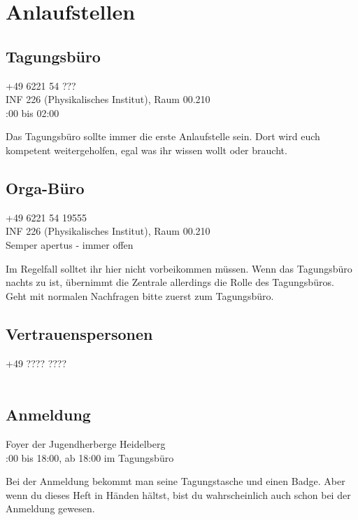 
\section{Anlaufstellen}

\subsection{Tagungsbüro}
\faPhone \quad +49 6221 54 ???\\ %
\faMapPin \quad INF 226 (Physikalisches Institut), Raum 00.210\\ %
\faClockO {}:00 bis 02:00 %

\noindent Das Tagungsbüro sollte immer die erste Anlaufstelle sein. Dort wird euch kompetent weitergeholfen, egal was ihr wissen wollt oder braucht.

\subsection{Orga-Büro}
\faPhone \quad +49 6221 54 19555\\
\faMapPin \quad INF 226 (Physikalisches Institut), Raum 00.210\\
\faClockO \quad Semper apertus - immer offen

\noindent Im Regelfall solltet ihr hier nicht vorbeikommen müssen. Wenn das Tagungsbüro nachts zu ist, übernimmt die Zentrale allerdings die Rolle des Tagungsbüros. Geht mit normalen Nachfragen bitte zuerst zum Tagungsbüro. %

\subsection{Vertrauenspersonen}
\faPhone \quad +49 ???? ????\\ %
\faUsers \quad \\ %

\noindent %

\subsection{Anmeldung}
\faMapPin \quad Foyer der Jugendherberge Heidelberg\\ %
\faClockO {}:00 bis 18:00, ab 18:00 im Tagungsbüro %

\noindent Bei der Anmeldung bekommt man seine Tagungstasche und einen Badge. Aber wenn du dieses Heft in Händen hältst, bist du wahrscheinlich auch schon bei der Anmeldung gewesen. %

